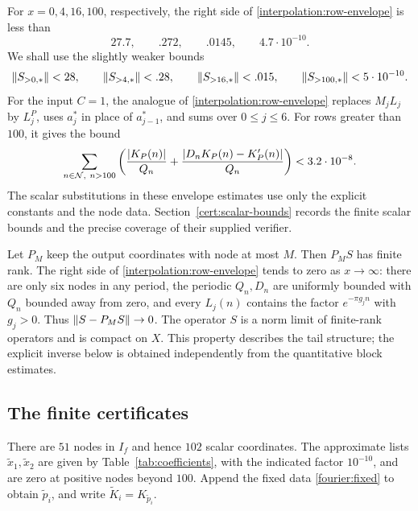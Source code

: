 For $x=0,4,16,100$, respectively, the right side of
\eqref{interpolation:row-envelope} is less than
\[
 27.7,\qquad .272,\qquad .0145,\qquad 4.7\cdot10^{-10}.
\]
We shall use the slightly weaker bounds
\begin{equation}\label{interpolation:tails}
 \left\lVert S_{>0,*}\right\rVert<28,\qquad
 \left\lVert S_{>4,*}\right\rVert<.28,\qquad
 \left\lVert S_{>16,*}\right\rVert<.015,\qquad
 \left\lVert S_{>100,*}\right\rVert<5\cdot10^{-10}.
\end{equation}
For the input $C=1$, the analogue of
\eqref{interpolation:row-envelope} replaces $M_jL_j$ by $L_j^P$,
uses $a_j^*$ in place of $a_{j-1}^*$, and sums over $0\le j\le6$.
For rows greater than $100$, it gives the bound
\begin{equation}\label{interpolation:atom-tail}
 \sum_{n\in\mathcal N,\ n>100}
 \left(\frac{\left\lvert K_P(n)\right\rvert}{Q_n}
 +\frac{\left\lvert D_nK_P(n)-K_P'(n)\right\rvert}{Q_n}\right)
 <3.2\cdot10^{-8}.
\end{equation}
The scalar substitutions in these envelope estimates use only the explicit
constants and the node data.  Section~\ref{cert:scalar-bounds} records the
finite scalar bounds and the precise coverage of their supplied verifier.

\begin{remark}
\label{interpolation:compactness}
Let $P_M$ keep the output coordinates with node at most $M$.  Then $P_MS$
has finite rank.  The right side of \eqref{interpolation:row-envelope}
tends to zero as $x\to\infty$: there are only six nodes in any period,
the periodic $Q_n,D_n$ are uniformly bounded with $Q_n$ bounded away from
zero, and every $L_j(n)$ contains the factor $e^{-\pi g_jn}$ with $g_j>0$.
Thus $\left\lVert S-P_MS\right\rVert\to0$.  The operator $S$ is a norm limit of finite-rank
operators and is compact on $X$.  This property describes the tail
structure; the explicit inverse below is obtained independently from the
quantitative block estimates.
\end{remark}

\subsection{The finite certificates}

There are $51$ nodes in $I_f$ and hence $102$ scalar coordinates.
The approximate lists $\widetilde x_1,\widetilde x_2$ are given by
Table~\ref{tab:coefficients}, with the indicated factor $10^{-10}$,
and are zero at positive nodes beyond $100$.  Append the fixed data
\eqref{fourier:fixed} to obtain $\widetilde p_i$, and write
$\widetilde K_i=K_{\widetilde p_i}$.

